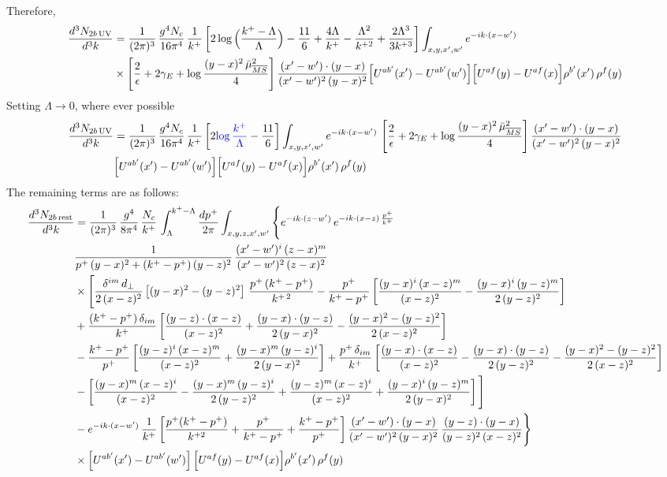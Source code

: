 \documentclass[9pt]{article}
\numberwithin{equation}{section}
\begin{document}
Therefore,
\begin{align}
\frac{d^{3}N_{2b\,\rm UV}}{d^{3}k}&=\frac{1}{(2\pi)^{3}}\,\frac{g^{4}N_{c}}{16\pi^{4}}\,\frac{1}{k^{+}}\left[2\log\Big(\frac{k^{+}-\Lambda}{\Lambda}\Big)-\frac{11}{6}+\frac{4\Lambda}{k^{+}}-\frac{\Lambda^{2}}{k^{+2}}+\frac{2\Lambda^{3}}{3k^{+3}}\right]\int_{x,y,x',w'}e^{-ik\cdot(x-w')}\notag\\
&\times\left[\frac{2}{\epsilon}+2\gamma_{E}+\log\frac{(y-x)^{2}\,\bar\mu^{2}_{\overline{MS}}}{4}\right]\frac{(x'-w')\cdot(y-x)}{(x'-w')^{2}\,(y-x)^{2}}\Big[U^{ab'}(x')-U^{ab'}(w')\Big]\Big[U^{af}(y)-U^{af}(x)\Big]\rho^{b'}(x')\,\rho^{f}(y)
\end{align}
Setting $\Lambda\to 0$, where ever possible
\begin{align}
\frac{d^{3}N_{2b\,\rm UV}}{d^{3}k}&=\frac{1}{(2\pi)^{3}}\,\frac{g^{4}N_{c}}{16\pi^{4}}\,\frac{1}{k^{+}}\left[2{\color{blue}\log\frac{k^{+}}{\Lambda}}-\frac{11}{6}\right]\int_{x,y,x',w'}e^{-ik\cdot(x-w')}\,\left[\frac{2}{\epsilon}+2\gamma_{E}+\log\frac{(y-x)^{2}\,\bar\mu^{2}_{\overline{MS}}}{4}\right]\frac{(x'-w')\cdot(y-x)}{(x'-w')^{2}\,(y-x)^{2}}\notag \\ & \Big[U^{ab'}(x')-U^{ab'}(w')\Big]\Big[U^{af}(y)-U^{af}(x)\Big]\rho^{b'}(x')\,\rho^{f}(y)
\end{align}   
The remaining terms are as follows: 
\begin{align}
\frac{d^{3}N_{2b\,\rm rest}}{d^{3}k}&=\frac{1}{(2\pi)^{3}}\,\frac{g^{4}}{8\pi^{4}}\,\frac{N_{c}}{k^{+}}\,\int_{\Lambda}^{k^{+}-\Lambda}\frac{dp^{+}}{2\pi}\int_{x,y,z,x',w'}\Bigg\{e^{-ik\cdot(z-w')}\,e^{-ik\cdot(x-z)\,\frac{p^{+}}{k^{+}}}\,\notag \\ & \frac{1}{p^{+}\,(y-x)^{2}+(k^{+}-p^{+})\,(y-z)^{2}}\,\frac{(x'-w')^{i}\,(z-x)^{m}}{(x'-w')^{2}\,(z-x)^{2}}\notag\\
&\times\Bigg[\frac{\delta^{im}\,d_{\perp}}{2\,(x-z)^{2}}\left[(y-x)^{2}-(y-z)^{2}\right]\,\frac{p^{+}\,(k^{+}-p^{+})}{k^{+\,2}}-\frac{p^{+}}{k^{+}-p^{+}}\left[\frac{(y-x)^{i}\,(x-z)^{m}}{(x-z)^{2}}-\frac{(y-x)^{i}\,(y-z)^{m}}{2\,(y-z)^{2}}\right]\notag\\
&+\frac{(k^{+}-p^{+})\,\delta_{im}}{k^{+}}\left[\frac{(y-z)\cdot(x-z)}{(x-z)^{2}}+\frac{(y-x)\cdot(y-z)}{2\,(y-x)^{2}}-\frac{(y-x)^{2}-(y-z)^{2}}{2\,(x-z)^{2}}\right]
\notag \\ & -\frac{k^{+}-p^{+}}{p^{+}}\left[\frac{(y-z)^{i}\,(x-z)^{m}}{(x-z)^{2}}+\frac{(y-x)^{m}\,(y-z)^{i}}{2\,(y-x)^{2}}\right]+\frac{p^{+}\,\delta_{im}}{k^{+}}\left[\frac{(y-x)\cdot(x-z)}{(x-z)^{2}}-\frac{(y-x)\cdot(y-z)}{2\,(y-z)^{2}}-\frac{(y-x)^{2}-(y-z)^{2}}{2\,(x-z)^{2}}\right]\notag\\
&-\left[\frac{(y-x)^{m}\,(x-z)^{i}}{(x-z)^{2}}-\frac{(y-x)^{m}\,(y-z)^{i}}{2\,(y-z)^{2}}+\frac{(y-z)^{m}\,(x-z)^{i}}{(x-z)^{2}}+\frac{(y-x)^{i}\,(y-z)^{m}}{2\,(y-x)^{2}}\right]\Bigg]\notag\\
&-e^{-ik\cdot(x-w')}\,\frac{1}{k^{+}}\left[\frac{p^{+}(k^{+}-p^{+})}{k^{+2}}+\frac{p^{+}}{k^{+}-p^{+}}+\frac{k^{+}-p^{+}}{p^{+}}\right]\frac{(x'-w')\cdot(y-x)}{(x'-w')^{2}\,(y-x)^{2}}\,\frac{(y-z)\cdot(y-x)}{(y-z)^{2}\,(x-z)^{2}}\Bigg\}\notag\\
&\times\Big[U^{ab'}(x')-U^{ab'}(w')\Big]\,\Big[U^{af}(y)-U^{af}(x)\Big]\rho^{b'}(x')\,\rho^{f}(y)
\end{align}
\end{document}
